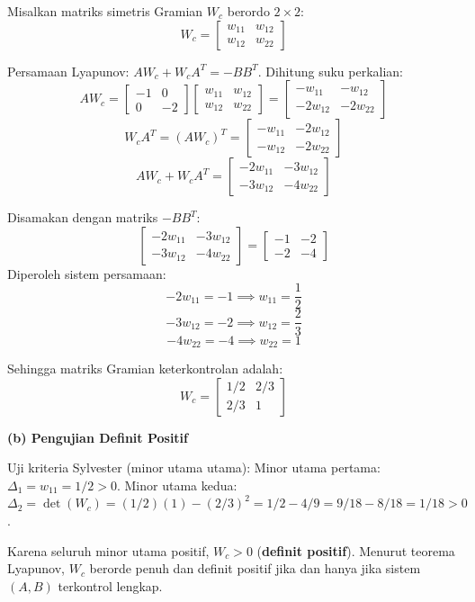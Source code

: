 \documentclass[11pt,a4paper]{article}
\begin{document}
Misalkan matriks simetris Gramian $W_c$ berordo $2 \times 2$:
$$W_c = \begin{bmatrix} w_{11} & w_{12} \\ w_{12} & w_{22} \end{bmatrix}$$

Persamaan Lyapunov: $A W_c + W_c A^T = -B B^T$.
Dihitung suku perkalian:
$$A W_c = \begin{bmatrix} -1 & 0 \\ 0 & -2 \end{bmatrix} \begin{bmatrix} w_{11} & w_{12} \\ w_{12} & w_{22} \end{bmatrix} = \begin{bmatrix} -w_{11} & -w_{12} \\ -2w_{12} & -2w_{22} \end{bmatrix}$$
$$W_c A^T = (A W_c)^T = \begin{bmatrix} -w_{11} & -2w_{12} \\ -w_{12} & -2w_{22} \end{bmatrix}$$
$$A W_c + W_c A^T = \begin{bmatrix} -2w_{11} & -3w_{12} \\ -3w_{12} & -4w_{22} \end{bmatrix}$$

Disamakan dengan matriks $-B B^T$:
$$\begin{bmatrix} -2w_{11} & -3w_{12} \\ -3w_{12} & -4w_{22} \end{bmatrix} = \begin{bmatrix} -1 & -2 \\ -2 & -4 \end{bmatrix}$$
Diperoleh sistem persamaan:
$$-2w_{11} = -1 \implies w_{11} = \frac{1}{2}$$
$$-3w_{12} = -2 \implies w_{12} = \frac{2}{3}$$
$$-4w_{22} = -4 \implies w_{22} = 1$$

Sehingga matriks Gramian keterkontrolan adalah:
$$W_c = \begin{bmatrix} 1/2 & 2/3 \\ 2/3 & 1 \end{bmatrix}$$

\textbf{(b) Pengujian Definit Positif}

Uji kriteria Sylvester (minor utama utama):
Minor utama pertama: $\Delta_1 = w_{11} = 1/2 > 0$.
Minor utama kedua: $\Delta_2 = \det(W_c) = (1/2)(1) - (2/3)^2 = 1/2 - 4/9 = 9/18 - 8/18 = 1/18 > 0$.

Karena seluruh minor utama positif, $W_c > 0$ (\textbf{definit positif}). Menurut teorema Lyapunov, $W_c$ berorde penuh dan definit positif jika dan hanya jika sistem $(A, B)$ terkontrol lengkap.
\end{document}
